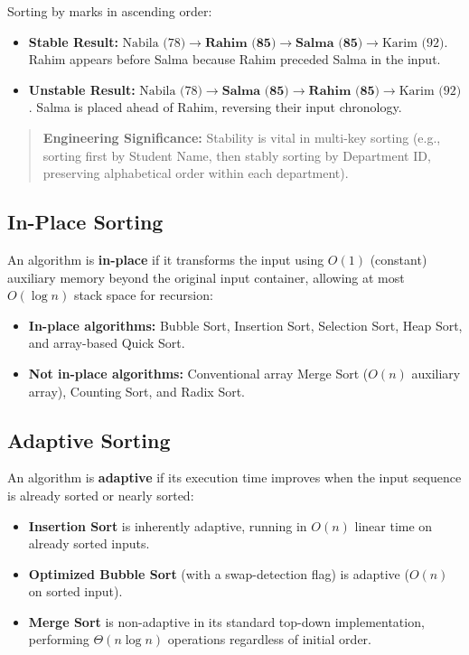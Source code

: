 Sorting by marks in ascending order:
\begin{itemize}
    \item \textbf{Stable Result:} $\text{Nabila (78)} \to \textbf{Rahim (85)} \to \textbf{Salma (85)} \to \text{Karim (92)}$. Rahim appears before Salma because Rahim preceded Salma in the input.
    \item \textbf{Unstable Result:} $\text{Nabila (78)} \to \textbf{Salma (85)} \to \textbf{Rahim (85)} \to \text{Karim (92)}$. Salma is placed ahead of Rahim, reversing their input chronology.
\end{itemize}

\begin{quote}
\textbf{Engineering Significance:} Stability is vital in multi-key sorting (e.g., sorting first by Student Name, then stably sorting by Department ID, preserving alphabetical order within each department).
\end{quote}

\subsection{In-Place Sorting}

An algorithm is \textbf{in-place} if it transforms the input using $O(1)$ (constant) auxiliary memory beyond the original input container, allowing at most $O(\log n)$ stack space for recursion:
\begin{itemize}
    \item \textbf{In-place algorithms:} Bubble Sort, Insertion Sort, Selection Sort, Heap Sort, and array-based Quick Sort.
    \item \textbf{Not in-place algorithms:} Conventional array Merge Sort ($O(n)$ auxiliary array), Counting Sort, and Radix Sort.
\end{itemize}

\subsection{Adaptive Sorting}

An algorithm is \textbf{adaptive} if its execution time improves when the input sequence is already sorted or nearly sorted:
\begin{itemize}
    \item \textbf{Insertion Sort} is inherently adaptive, running in $O(n)$ linear time on already sorted inputs.
    \item \textbf{Optimized Bubble Sort} (with a swap-detection flag) is adaptive ($O(n)$ on sorted input).
    \item \textbf{Merge Sort} is non-adaptive in its standard top-down implementation, performing $\Theta(n \log n)$ operations regardless of initial order.
\end{itemize}

